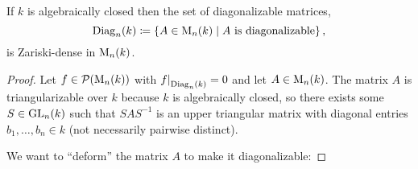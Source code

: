 \begin{proposition}
  \label{proposition: diagonalizable matrices are dense for algebraically closed}
  If $k$ is algebraically closed then the set of diagonalizable matrices,
  \[
              \operatorname{Diag}_n(k)
    \coloneqq \{
                A \in \operatorname{M}_n(k)
              \mid
                \text{$A$ is diagonalizable}
              \} \,,
  \]
  is Zariski-dense in $\operatorname{M}_n(k)$.
\end{proposition}
\begin{proof}
  Let $f \in \mathcal{P}(\operatorname{M}_n(k))$ with $\restrict{f}{\Diag_n(k)} = 0$ and let $A \in \operatorname{M}_n(k)$.
  The matrix $A$ is triangularizable over $k$ because $k$ is algebraically closed, so there exists some $S \in \operatorname{GL}_n(k)$ such that $S A S^{-1}$ is an upper triangular matrix with diagonal entries $b_1, \dotsc, b_n \in k$ (not necessarily pairwise distinct).
  
  We want to \enquote{deform} the matrix $A$ to make it diagonalizable:
  

\end{proof}
